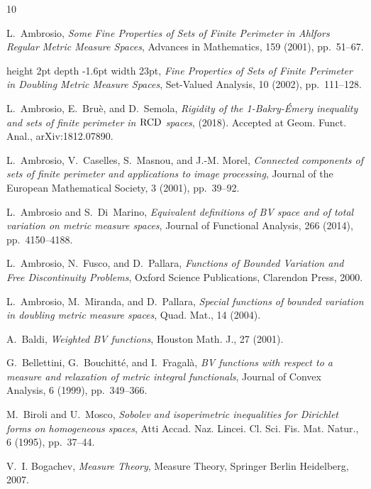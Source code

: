 \documentclass[reqno]{amsart}
\numberwithin{equation}{section}
\newcommand{\1}{\mathbbm 1}
\begin{document}
\begin{thebibliography}{10}

{\sc L.~Ambrosio}, {\em Some {F}ine {P}roperties of {S}ets of {F}inite
  {P}erimeter in {A}hlfors {R}egular {M}etric {M}easure {S}paces}, Advances in
  Mathematics, 159 (2001), pp.~51--67.

\leavevmode\vrule height 2pt depth -1.6pt width 23pt, {\em Fine {P}roperties of
  {S}ets of {F}inite {P}erimeter in {D}oubling {M}etric {M}easure {S}paces},
  Set-Valued Analysis, 10 (2002), pp.~111--128.

{\sc L.~Ambrosio, E.~Bru{\`{e}}, and D.~Semola}, {\em Rigidity of the
  1-{B}akry-\'{E}mery inequality and sets of finite perimeter in $\rm
  {R}{C}{D}$ spaces},  (2018).
\newblock Accepted at Geom. Funct. Anal., arXiv:1812.07890.

{\sc L.~Ambrosio, V.~Caselles, S.~Masnou, and J.-M. Morel}, {\em Connected
  components of sets of finite perimeter and applications to image processing},
  Journal of the European Mathematical Society, 3 (2001), pp.~39--92.

{\sc L.~Ambrosio and S.~Di~Marino}, {\em Equivalent definitions of {B}{V} space
  and of total variation on metric measure spaces}, Journal of Functional
  Analysis, 266 (2014), pp.~4150--4188.

{\sc L.~Ambrosio, N.~Fusco, and D.~Pallara}, {\em Functions of {B}ounded
  {V}ariation and {F}ree {D}iscontinuity {P}roblems}, Oxford Science
  Publications, Clarendon Press, 2000.

{\sc L.~Ambrosio, M.~Miranda, and D.~Pallara}, {\em Special functions of
  bounded variation in doubling metric measure spaces}, Quad. Mat., 14 (2004).

{\sc A.~Baldi}, {\em Weighted {B}{V} functions}, Houston Math. J., 27 (2001).

{\sc G.~Bellettini, G.~Bouchitt\'e, and I.~Fragal\`a}, {\em B{V} functions with
  respect to a measure and relaxation of metric integral functionals}, Journal
  of Convex Analysis, 6 (1999), pp.~349--366.

{\sc M.~Biroli and U.~Mosco}, {\em Sobolev and isoperimetric inequalities for
  {D}irichlet forms on homogeneous spaces}, Atti Accad. Naz. Lincei. Cl. Sci.
  Fis. Mat. Natur., 6 (1995), pp.~37--44.

{\sc V.~I. Bogachev}, {\em Measure {T}heory}, Measure Theory, Springer Berlin
  Heidelberg, 2007.


\end{thebibliography}
\end{document}
